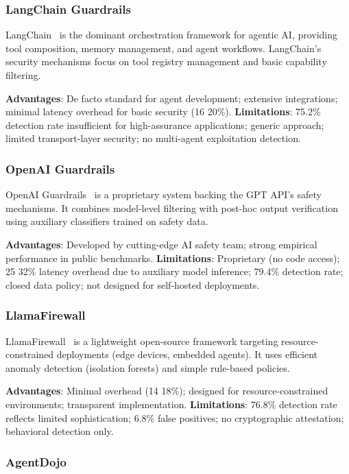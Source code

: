\documentclass[12pt,twocolumn,journal]{IEEEtran}
\begin{document}
\subsubsection{LangChain Guardrails}

LangChain~\cite{LangChain2024} is the dominant orchestration framework for agentic AI, providing tool composition, memory management, and agent workflows. LangChain's security mechanisms focus on tool registry management and basic capability filtering.

\textbf{Advantages}: De facto standard for agent development; extensive integrations; minimal latency overhead for basic security (16 20\%).
\textbf{Limitations}: 75.2\% detection rate insufficient for high-assurance applications; generic approach; limited transport-layer security; no multi-agent exploitation detection.

\subsubsection{OpenAI Guardrails}

OpenAI Guardrails~\cite{OpenAIGuardrails2024} is a proprietary system backing the GPT API's safety mechanisms. It combines model-level filtering with post-hoc output verification using auxiliary classifiers trained on safety data.

\textbf{Advantages}: Developed by cutting-edge AI safety team; strong empirical performance in public benchmarks.
\textbf{Limitations}: Proprietary (no code access); 25 32\% latency overhead due to auxiliary model inference; 79.4\% detection rate; closed data policy; not designed for self-hosted deployments.

\subsubsection{LlamaFirewall}

LlamaFirewall~\cite{LlamaFirewall2024} is a lightweight open-source framework targeting resource-constrained deployments (edge devices, embedded agents). It uses efficient anomaly detection (isolation forests) and simple rule-based policies.

\textbf{Advantages}: Minimal overhead (14 18\%); designed for resource-constrained environments; transparent implementation.
\textbf{Limitations}: 76.8\% detection rate reflects limited sophistication; 6.8\% false positives; no cryptographic attestation; behavioral detection only.

\subsubsection{AgentDojo}
\end{document}

